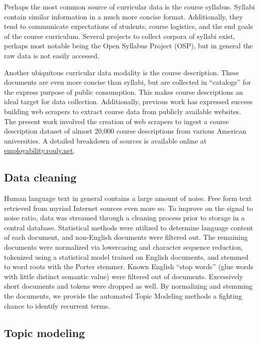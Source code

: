 Perhaps the most common source of curricular data is the course syllabus.
Syllabi contain similar information in a much more concise format.
Additionally, they tend to communicate expectations of students, course logistics, and the end goals of the course curriculum.
Several projects to collect corpora of syllabi exist, perhaps most notable being the Open Syllabus Project (OSP), but in general the raw data is not easily accessed.

Another ubiquitous curricular data modality is the course description.
These documents are even more concise than syllabi, but are collected in ``catalogs'' for the express purpose of public consumption.
This makes course descriptions an ideal target for data collection.
Additionally, previous work has expressed success building web scrapers to extract course data from publicly available websites.~\cite{rouly2015}
The present work involved the creation of web scrapers to ingest a course description dataset of almost 20,000 course descriptions from various American universities.
A detailed breakdown of sources is available online at \href{http://employability.rouly.net}{employability.rouly.net}.

\subsection{Data cleaning}

Human language text in general contains a large amount of noise.
Free form text retrieved from myriad Internet sources even more so.
To improve on the signal to noise ratio, data was streamed through a cleaning process prior to storage in a central database.
Statistical methods were utilized to determine language content of each document, and non-English documents were filtered out.
The remaining documents were normalized via lowercasing and character sequence reduction, tokenized using a statistical model trained on English documents, and stemmed to word roots with the Porter stemmer.
Known English ``stop words'' (glue words with little distinct semantic value) were filtered out of documents.
Excessively short documents and tokens were dropped as well.
By normalizing and stemming the documents, we provide the automated Topic Modeling methods a fighting chance to identify recurrent terms.

\subsection{Topic modeling}

